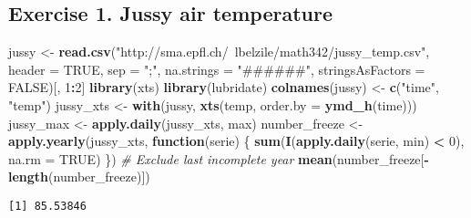 \documentclass[]{book}
\newenvironment{Shaded}{\begin{snugshade}}{\end{snugshade}}
\newcommand{\KeywordTok}[1]{\textcolor[rgb]{0.13,0.29,0.53}{\textbf{#1}}}
\newcommand{\DataTypeTok}[1]{\textcolor[rgb]{0.13,0.29,0.53}{#1}}
\newcommand{\DecValTok}[1]{\textcolor[rgb]{0.00,0.00,0.81}{#1}}
\newcommand{\StringTok}[1]{\textcolor[rgb]{0.31,0.60,0.02}{#1}}
\newcommand{\CommentTok}[1]{\textcolor[rgb]{0.56,0.35,0.01}{\textit{#1}}}
\newcommand{\OtherTok}[1]{\textcolor[rgb]{0.56,0.35,0.01}{#1}}
\newcommand{\ControlFlowTok}[1]{\textcolor[rgb]{0.13,0.29,0.53}{\textbf{#1}}}
\newcommand{\OperatorTok}[1]{\textcolor[rgb]{0.81,0.36,0.00}{\textbf{#1}}}
\newcommand{\NormalTok}[1]{#1}
\begin{document}
\subsection{Exercise 1. Jussy air
temperature}\label{exercise-1.-jussy-air-temperature-1}

\begin{Shaded}
\begin{Highlighting}[]
\NormalTok{jussy <-}\StringTok{ }\KeywordTok{read.csv}\NormalTok{(}\StringTok{"http://sma.epfl.ch/~lbelzile/math342/jussy_temp.csv"}\NormalTok{, }\DataTypeTok{header =} \OtherTok{TRUE}\NormalTok{, }
    \DataTypeTok{sep =} \StringTok{";"}\NormalTok{, }\DataTypeTok{na.strings =} \StringTok{"######"}\NormalTok{, }\DataTypeTok{stringsAsFactors =} \OtherTok{FALSE}\NormalTok{)[, }\DecValTok{1}\OperatorTok{:}\DecValTok{2}\NormalTok{]}
\KeywordTok{library}\NormalTok{(xts)}
\KeywordTok{library}\NormalTok{(lubridate)}
\KeywordTok{colnames}\NormalTok{(jussy) <-}\StringTok{ }\KeywordTok{c}\NormalTok{(}\StringTok{"time"}\NormalTok{, }\StringTok{"temp"}\NormalTok{)}
\NormalTok{jussy_xts <-}\StringTok{ }\KeywordTok{with}\NormalTok{(jussy, }\KeywordTok{xts}\NormalTok{(temp, }\DataTypeTok{order.by =} \KeywordTok{ymd_h}\NormalTok{(time)))}
\NormalTok{jussy_max <-}\StringTok{ }\KeywordTok{apply.daily}\NormalTok{(jussy_xts, max)}
\NormalTok{number_freeze <-}\StringTok{ }\KeywordTok{apply.yearly}\NormalTok{(jussy_xts, }\ControlFlowTok{function}\NormalTok{(serie) \{}
    \KeywordTok{sum}\NormalTok{(}\KeywordTok{I}\NormalTok{(}\KeywordTok{apply.daily}\NormalTok{(serie, min) }\OperatorTok{<}\StringTok{ }\DecValTok{0}\NormalTok{), }\DataTypeTok{na.rm =} \OtherTok{TRUE}\NormalTok{)}
\NormalTok{\})}
\CommentTok{# Exclude last incomplete year}
\KeywordTok{mean}\NormalTok{(number_freeze[}\OperatorTok{-}\KeywordTok{length}\NormalTok{(number_freeze)])}
\end{Highlighting}
\end{Shaded}

\begin{verbatim}
[1] 85.53846
\end{verbatim}

\begin{Shaded}
\end{Shaded}
\end{document}
